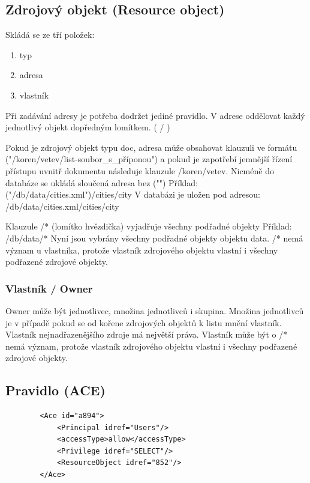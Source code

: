 \documentclass[11pt,twoside,a4paper]{book}
\begin{document}
\subsection {Zdrojový objekt (Resource object)}
Skládá se ze tří položek:
\begin{enumerate}
\item typ
\item adresa
\item vlastník
\end{enumerate}

Při zadávání adresy je potřeba dodržet jediné pravidlo. V adrese oddělovat každý jednotlivý objekt dopředným lomítkem. ( / )

Pokud je zdrojový objekt typu doc, adresa může obsahovat klauzuli ve formátu ("/koren/vetev/list-soubor\_s\_příponou") a pokud je zapotřebí jemnější řízení přístupu uvnitř dokumentu následuje klauzule /koren/vetev. Nicméně do databáze se ukládá sloučená adresa bez ("")
Příklad:  ("/db/data/cities.xml")/cities/city
V databázi je uložen pod adresou: /db/data/cities.xml/cities/city

Klauzule /* (lomítko hvězdička) vyjadřuje všechny podřadné objekty
Příklad:  /db/data/*
Nyní jsou vybrány všechny podřadné objekty objektu data.
/* nemá význam u vlastníka, protože vlastník zdrojového objektu vlastní i všechny podřazené zdrojové objekty.

\subsubsection{Vlastník / Owner}
Owner může být jednotlivec, množina jednotlivců i skupina.
Množina jednotlivců je v případě pokud se od kořene zdrojových objektů k listu mnění vlastník. Vlastník nejnadřazenějšího zdroje má největší práva. Vlastník může být o 
/* nemá význam, protože vlastník zdrojového objektu vlastní i všechny podřazené zdrojové objekty.

\subsection{Pravidlo (ACE)}
\begin{verbatim}
        <Ace id="a894">
            <Principal idref="Users"/>
            <accessType>allow</accessType>
            <Privilege idref="SELECT"/>
            <ResourceObject idref="852"/>
        </Ace>
\end{verbatim}


\end{document}
